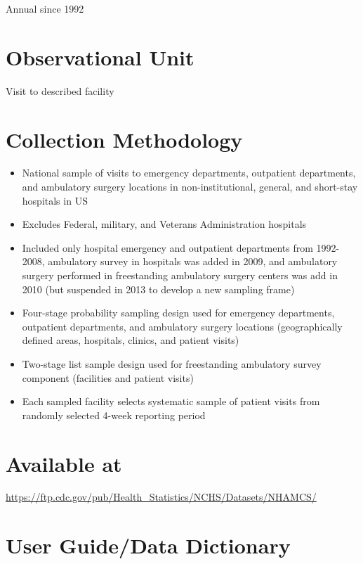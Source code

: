 \documentclass[
]{book}
\providecommand{\tightlist}{%
  \setlength{\itemsep}{0pt}\setlength{\parskip}{0pt}}
\begin{document}
Annual since 1992

\hypertarget{observational-unit-52}{%
\section{Observational Unit}\label{observational-unit-52}}

Visit to described facility

\hypertarget{collection-methodology-52}{%
\section{Collection Methodology}\label{collection-methodology-52}}

\begin{itemize}
\tightlist
\item
  National sample of visits to emergency departments, outpatient departments, and ambulatory surgery locations in non-institutional, general, and short-stay hospitals in US
\item
  Excludes Federal, military, and Veterans Administration hospitals
\item
  Included only hospital emergency and outpatient departments from 1992-2008, ambulatory survey in hospitals was added in 2009, and ambulatory surgery performed in freestanding ambulatory surgery centers was add in 2010 (but suspended in 2013 to develop a new sampling frame)
\item
  Four-stage probability sampling design used for emergency departments, outpatient departments, and ambulatory surgery locations (geographically defined areas, hospitals, clinics, and patient visits)
\item
  Two-stage list sample design used for freestanding ambulatory survey component (facilities and patient visits)
\item
  Each sampled facility selects systematic sample of patient visits from randomly selected 4-week reporting period
\end{itemize}

\hypertarget{available-at-52}{%
\section{Available at}\label{available-at-52}}

\url{https://ftp.cdc.gov/pub/Health_Statistics/NCHS/Datasets/NHAMCS/}

\hypertarget{user-guidedata-dictionary-52}{%
\section{User Guide/Data Dictionary}\label{user-guidedata-dictionary-52}}
\end{document}
